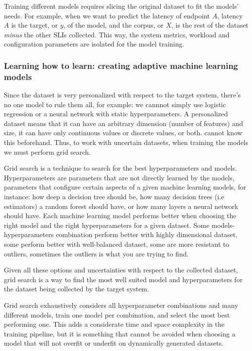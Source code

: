 Training different models requires slicing the original dataset to fit the models' needs. For example, when we want to predict the latency of endpoint $A$, latency $A$ is the target, or $y$, of the model, and the corpus, or $X$, is the rest of the dataset \textit{minus} the other SLIs collected. This way, the system metrics, workload and configuration parameters are isolated for the model training.

\subsubsection{Learning how to learn: creating adaptive machine learning models}

Since the dataset is very personalized with respect to the target system, there's no one model to rule them all, for example: we cannnot simply use logistic regression or a neural network with static hyperparameters. A personalized dataset means that it can have an arbitrary dimension (number of features) and size, it can have only continuous values or discrete values, or both. \projectname{} cannot know this beforehand. Thus, to work with uncertain datasets, when training the models we must perform grid search.

Grid search is a technique to search for the best hyperparameters and models. Hyperparameters are parameters that are not directly learned by the models, parameters that configure certain aspects of a given machine learning models, for instance: how deep a decision tree should be, how many decision trees (i.e estimators) a random forest should have, or how many layers a neural network should have. Each machine learning model performs better when choosing the right model and the right hyperparameters for a given dataset. Some models-hyperparameters combination perform better with highly dimensional dataset, some perform better with well-balanced dataset, some are more resistant to outliers, sometimes the outliers is what you are trying to find. 

Given all these options and uncertainties with respect to the collected dataset, grid search is a way to find the most well suited model and hyperparameters for the dataset being collected by the target system.

Grid search exhaustively considers all hyperparameter combinations and many different models, train one model per combination, and select the most best performing one. This adds a considerate time and space complexity in the training pipeline, but it is something that cannot be avoided when choosing a model that will not overfit or underfit on dynamically generated datasets. 


